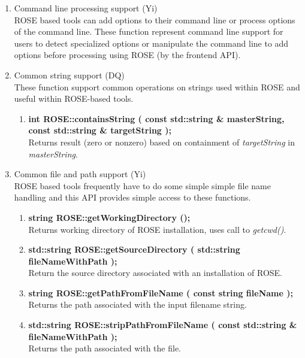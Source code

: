 \begin{enumerate}
   \item Command line processing support (Yi) \\
   ROSE based tools can add options to their command line or process options of the
   command line.  These function represent command line support for users to detect
   specialized options or manipulate the command line to add options before processing
   using ROSE (by the frontend API).

   \item Common string support (DQ) \\
         These function support common operations on strings used within ROSE and 
         useful within ROSE-based tools.
   \begin{enumerate}
      \item {\bf int ROSE::containsString ( const std::string \& masterString, const std::string \& targetString );} \\
      Returns result (zero or nonzero) based on containment of {\em targetString} in {\em masterString}.
   \end{enumerate}

   \item Common file and path support (Yi) \\
   ROSE based tools frequently have to do some simple simple file name handling
   and this API provides simple access to these functions.
   \begin{enumerate}
      \item {\bf string ROSE::getWorkingDirectory ();} \\
      Returns working directory of ROSE installation, uses call to {\em getcwd()}.

      \item {\bf std::string ROSE::getSourceDirectory ( std::string fileNameWithPath );} \\
      Return the source directory associated with an installation of ROSE.

      \item {\bf string ROSE::getPathFromFileName ( const string fileName );} \\
      Returns the path associated with the input filename string.

      \item {\bf std::string ROSE::stripPathFromFileName ( const std::string \& fileNameWithPath );} \\
      Returns the path associated with the file.


\end{enumerate}
\end{enumerate}
